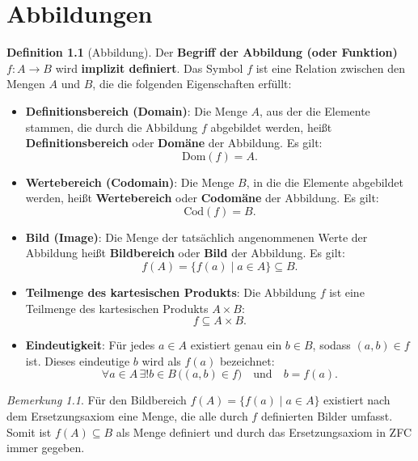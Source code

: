 \documentclass{book}
\theoremstyle{plain}
\theoremstyle{remark}
\newtheorem*{remark}{Bemerkung}
\theoremstyle{definition}
\newtheorem{definition}{Definition}[section]
\begin{document}
\chapter{Abbildungen}

\begin{definition}[Abbildung]
    Der \textbf{Begriff der Abbildung (oder Funktion)} \( f: A \to B \) wird \textbf{implizit definiert}. Das Symbol \( f \) ist eine Relation zwischen den Mengen \( A \) und \( B \), die die folgenden Eigenschaften erfüllt:
    
    \begin{itemize}
        \item \textbf{Definitionsbereich (Domain)}: Die Menge \( A \), aus der die Elemente stammen, die durch die Abbildung \( f \) abgebildet werden, heißt \textbf{Definitionsbereich} oder \textbf{Domäne} der Abbildung. Es gilt:
        \[
        \text{Dom}(f) = A.
        \]
        
        \item \textbf{Wertebereich (Codomain)}: Die Menge \( B \), in die die Elemente abgebildet werden, heißt \textbf{Wertebereich} oder \textbf{Codomäne} der Abbildung. Es gilt:
        \[
        \text{Cod}(f) = B.
        \]
        
        \item \textbf{Bild (Image)}: Die Menge der tatsächlich angenommenen Werte der Abbildung heißt \textbf{Bildbereich} oder \textbf{Bild} der Abbildung. Es gilt:
        \[
        f(A) = \{ f(a) \mid a \in A \} \subseteq B.
        \]
        
        \item \textbf{Teilmenge des kartesischen Produkts}: Die Abbildung \( f \) ist eine Teilmenge des kartesischen Produkts \( A \times B \):
        \[
        f \subseteq A \times B.
        \]
        
        \item \textbf{Eindeutigkeit}: Für jedes \( a \in A \) existiert genau ein \( b \in B \), sodass \( (a, b) \in f \) ist. Dieses eindeutige \( b \) wird als \( f(a) \) bezeichnet:
        \[
        \forall a \in A \, \exists! b \in B \, \big( (a, b) \in f \big) \quad \text{und} \quad b = f(a).
        \]
    \end{itemize}
\end{definition}
\begin{remark}
     Für den Bildbereich \( f(A) = \{ f(a) \mid a \in A \} \) existiert nach dem Ersetzungsaxiom eine Menge, die alle durch \( f \) definierten Bilder umfasst. Somit ist \( f(A) \subseteq B \) als Menge definiert und durch das Ersetzungsaxiom in ZFC immer gegeben.
\end{remark}
\end{document}
